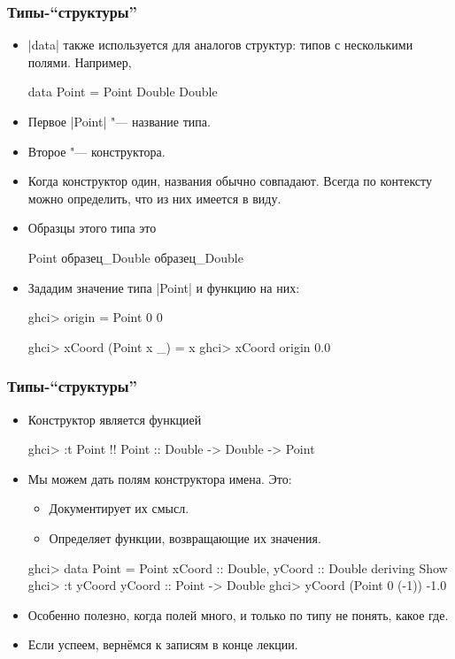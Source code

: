 \documentclass[10pt]{beamer}
\begin{document}
\begin{frame}[fragile]
  \frametitle{Типы-\enquote{структуры}}
  \begin{itemize}
    \item \haskinline|data| также используется для аналогов структур: типов с несколькими полями. Например,
          \begin{haskell}
data Point = Point Double Double
\end{haskell}
    \item Первое \haskinline|Point| "--- название типа.
    \item Второе "--- конструктора.
    \item Когда конструктор один, названия обычно совпадают. Всегда по контексту можно определить, что из них имеется в виду.
    \item Образцы этого типа \pause это\\
          \begin{haskell}
            Point образец_Double образец_Double
          \end{haskell}
    \item Зададим значение типа \haskinline|Point| и функцию на них:
          \begin{haskell}
            ghci> origin = Point 0 0

            ghci> xCoord (Point x _) = x
            ghci> xCoord origin
            0.0
          \end{haskell}
  \end{itemize}
\end{frame}

\begin{frame}[fragile]
  \frametitle{Типы-\enquote{структуры}}
  \begin{itemize}
    \item Конструктор является функцией
          \begin{haskell}
            ghci> :t Point !\pause!
            Point :: Double -> Double -> Point
          \end{haskell}
    \item Мы можем дать полям конструктора имена. Это:\hypertarget{rec1}{}
          \begin{itemize}
            \item Документирует их смысл.
            \item Определяет функции, возвращающие их значения.
          \end{itemize}
          \begin{haskell}
            ghci> data Point = Point { xCoord :: Double, yCoord :: Double } deriving Show
            ghci> :t yCoord
            yCoord :: Point -> Double
            ghci> yCoord (Point 0 (-1))
            -1.0
          \end{haskell}
    \item Особенно полезно, когда полей много, и только по типу не понять, какое где.
    \item Если успеем, вернёмся к записям в конце лекции. \hyperlink{rec2}{}
  \end{itemize}
\end{frame}
\end{document}
